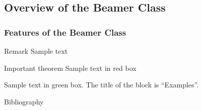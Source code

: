 \documentclass[usenames,dvipsnames,aspectratio=149,8pt]{beamer}
\begin{document}
\subsection{Overview of the Beamer Class}
\frame
{
  \frametitle{Features of the Beamer Class}

    \begin{block}{Remark}
    Sample text
    \end{block}
    
    \begin{alertblock}{Important theorem}
    Sample text in red box
    \end{alertblock}
    
    \begin{examples}
    Sample text in green box. The title of the block is ``Examples''. \cite{article1}
    \end{examples}

}
\nocite{*}
\begin{frame}[allowframebreaks]{Bibliography}
\printbibliography
\end{frame}
\end{document}
